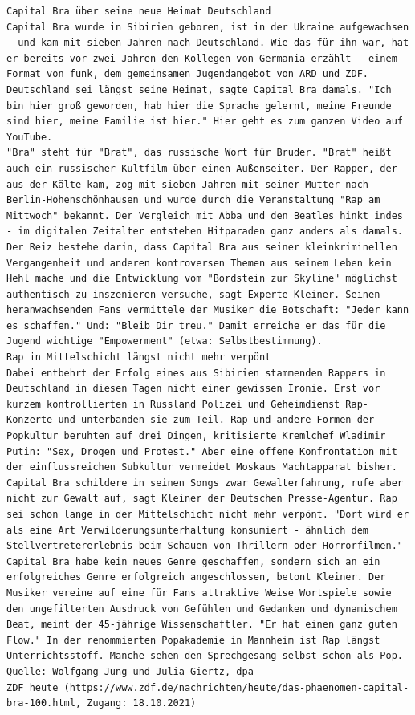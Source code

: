 \documentclass[
  letterpaper,
  DIV=11,
  numbers=noendperiod]{scrreprt}
\begin{document}
\begin{verbatim}
Capital Bra über seine neue Heimat Deutschland
Capital Bra wurde in Sibirien geboren, ist in der Ukraine aufgewachsen - und kam mit sieben Jahren nach Deutschland. Wie das für ihn war, hat er bereits vor zwei Jahren den Kollegen von Germania erzählt - einem Format von funk, dem gemeinsamen Jugendangebot von ARD und ZDF. Deutschland sei längst seine Heimat, sagte Capital Bra damals. "Ich bin hier groß geworden, hab hier die Sprache gelernt, meine Freunde sind hier, meine Familie ist hier." Hier geht es zum ganzen Video auf YouTube.
"Bra" steht für "Brat", das russische Wort für Bruder. "Brat" heißt auch ein russischer Kultfilm über einen Außenseiter. Der Rapper, der aus der Kälte kam, zog mit sieben Jahren mit seiner Mutter nach Berlin-Hohenschönhausen und wurde durch die Veranstaltung "Rap am Mittwoch" bekannt. Der Vergleich mit Abba und den Beatles hinkt indes - im digitalen Zeitalter entstehen Hitparaden ganz anders als damals.
Der Reiz bestehe darin, dass Capital Bra aus seiner kleinkriminellen Vergangenheit und anderen kontroversen Themen aus seinem Leben kein Hehl mache und die Entwicklung vom "Bordstein zur Skyline" möglichst authentisch zu inszenieren versuche, sagt Experte Kleiner. Seinen heranwachsenden Fans vermittele der Musiker die Botschaft: "Jeder kann es schaffen." Und: "Bleib Dir treu." Damit erreiche er das für die Jugend wichtige "Empowerment" (etwa: Selbstbestimmung).
Rap in Mittelschicht längst nicht mehr verpönt
Dabei entbehrt der Erfolg eines aus Sibirien stammenden Rappers in Deutschland in diesen Tagen nicht einer gewissen Ironie. Erst vor kurzem kontrollierten in Russland Polizei und Geheimdienst Rap-Konzerte und unterbanden sie zum Teil. Rap und andere Formen der Popkultur beruhten auf drei Dingen, kritisierte Kremlchef Wladimir Putin: "Sex, Drogen und Protest." Aber eine offene Konfrontation mit der einflussreichen Subkultur vermeidet Moskaus Machtapparat bisher. Capital Bra schildere in seinen Songs zwar Gewalterfahrung, rufe aber nicht zur Gewalt auf, sagt Kleiner der Deutschen Presse-Agentur. Rap sei schon lange in der Mittelschicht nicht mehr verpönt. "Dort wird er als eine Art Verwilderungsunterhaltung konsumiert - ähnlich dem Stellvertretererlebnis beim Schauen von Thrillern oder Horrorfilmen."
Capital Bra habe kein neues Genre geschaffen, sondern sich an ein erfolgreiches Genre erfolgreich angeschlossen, betont Kleiner. Der Musiker vereine auf eine für Fans attraktive Weise Wortspiele sowie den ungefilterten Ausdruck von Gefühlen und Gedanken und dynamischem Beat, meint der 45-jährige Wissenschaftler. "Er hat einen ganz guten Flow." In der renommierten Popakademie in Mannheim ist Rap längst Unterrichtsstoff. Manche sehen den Sprechgesang selbst schon als Pop.
Quelle: Wolfgang Jung und Julia Giertz, dpa
ZDF heute (https://www.zdf.de/nachrichten/heute/das-phaenomen-capital-bra-100.html, Zugang: 18.10.2021)
\end{verbatim}
\end{document}
